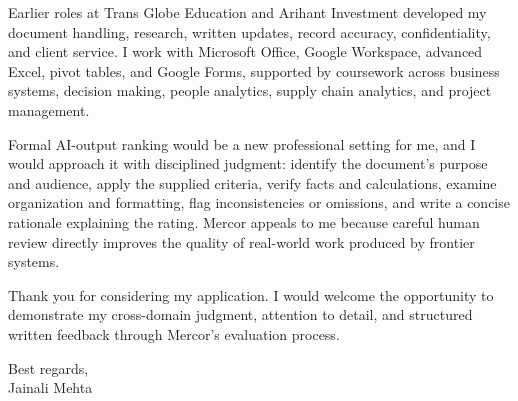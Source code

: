 \documentclass[letterpaper,11pt]{article}
\begin{document}
\bigbreak
Earlier roles at Trans Globe Education and Arihant Investment developed my document handling, research, written updates, record accuracy, confidentiality, and client service. I work with Microsoft Office, Google Workspace, advanced Excel, pivot tables, and Google Forms, supported by coursework across business systems, decision making, people analytics, supply chain analytics, and project management.

\bigbreak
Formal AI-output ranking would be a new professional setting for me, and I would approach it with disciplined judgment: identify the document's purpose and audience, apply the supplied criteria, verify facts and calculations, examine organization and formatting, flag inconsistencies or omissions, and write a concise rationale explaining the rating. Mercor appeals to me because careful human review directly improves the quality of real-world work produced by frontier systems.

\bigbreak
Thank you for considering my application. I would welcome the opportunity to demonstrate my cross-domain judgment, attention to detail, and structured written feedback through Mercor's evaluation process.

\bigbreak
Best regards,\\
Jainali Mehta
\end{document}
